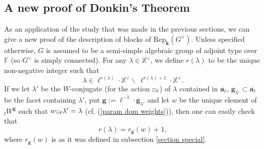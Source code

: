 \documentclass[11pt]{amsart}
\theoremstyle{plain}
\theoremstyle{remark}
\newcommand{\car}{\mbox{\relsize{-5}$\Box$}}
\numberwithin{equation}{section}
\begin{document}
	\subsection{A new proof of Donkin's Theorem}\label{A new proof of Donkin's Theorem}
	As an application of the study that was made in the previous sections, we can give a new proof of the description of blocks of $\mathrm{Rep}_\mathbf{k}(G^\vee)$. Unless specified otherwise, $G$ is assumed to be a semi-simple algebraic group of adjoint type over $\mathbb{F}$ (so $G^\vee$ is simply connected). For any $\lambda\in\mathbb{X}^\vee$, we define $r(\lambda)$ to be the unique non-negative integer such that $$\lambda\in\ell^{r(\lambda)}\cdot\mathbb{X}^\vee\backslash~ \ell^{r(\lambda)+1}\cdot\mathbb{X}^\vee.$$
	If we let $\lambda'$ be the $W$-conjugate (for the action $\car_\ell$) of $\lambda$ contained in $\overline{\mathbf{a}_\ell}$, $\mathbf{g}_{\lambda'}\subset \overline{\mathbf{a}_\ell}$ be the facet containing $\lambda'$, put $\mathbf{g}:=\ell^{-1}\cdot\mathbf{g}_{\lambda'}$ and let  $w$ be the unique element of  ${_\mathrm{f}W}^{\mathbf{g}}$ such that $w\car_\ell\lambda'=\lambda$ (cf. (\ref{param dom weights})), then one can easily check that $$r(\lambda)=r_\mathbf{g}(w)+1,$$ where $r_\mathbf{g}(w)$ is as it was defined in subsection \ref{section special}.
	
\end{document}
